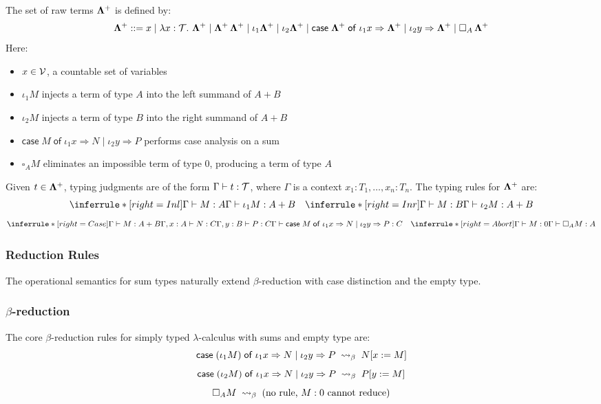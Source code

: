 \begin{definition}
The set of raw terms \( \mathbf{\Lambda}^+ \) is defined by:
\[
  \mathbf{\Lambda}^+ ::= x 
    \mid \lambda x : \mathcal{T}.\ \mathbf{\Lambda}^+ 
    \mid \mathbf{\Lambda}^+\,\mathbf{\Lambda}^+ 
    \mid \iota_1 \mathbf{\Lambda}^+ 
    \mid \iota_2 \mathbf{\Lambda}^+ 
    \mid \mathsf{case}\; \mathbf{\Lambda}^+\; \mathsf{of}\;\iota_1 x \Rightarrow \mathbf{\Lambda}^+ \mid \iota_2 y \Rightarrow \mathbf{\Lambda}^+
    \mid \square_A\,\mathbf{\Lambda}^+
\]
Here:
\begin{itemize}
  \item \( x \in \mathcal{V} \), a countable set of variables
  \item \( \iota_1 M \) injects a term of type $A$ into the left summand of $A+B$
  \item \( \iota_2 M \) injects a term of type $B$ into the right summand of $A+B$
  \item \( \mathsf{case}\;M\;\mathsf{of}\;\iota_1 x \Rightarrow N \mid \iota_2 y \Rightarrow P \) performs case analysis on a sum
  \item \( \square_A M \) eliminates an impossible term of type $0$, producing a term of type $A$
\end{itemize}
\end{definition}
\begin{definition}
Given $t \in \mathbf{\Lambda}^+$, typing judgments are of the form \( \Gamma \vdash t : \mathcal{T} \), where \( \Gamma \) is a context \( x_1 : T_1, \dots, x_n : T_n \). The typing rules for \( \mathbf{\Lambda}^+ \) are:
\[
  \inferrule*[right=Inl]
  { \Gamma \vdash M : A }
  { \Gamma \vdash \iota_1 M : A + B }
  \quad
  \inferrule*[right=Inr]
  { \Gamma \vdash M : B }
  { \Gamma \vdash \iota_2 M : A + B }
\]
\[
  \inferrule*[right=Case]
  { \Gamma \vdash M : A + B \\ \Gamma, x:A \vdash N : C \\ \Gamma, y:B \vdash P : C }
  { \Gamma \vdash \mathsf{case}\;M\;\mathsf{of}\;\iota_1 x \Rightarrow N \mid \iota_2 y \Rightarrow P : C }
  \quad
  \inferrule*[right=Abort]
  { \Gamma \vdash M : 0 }
  { \Gamma \vdash \square_A M : A }
\]

\end{definition}
\subsubsection{\centering Reduction Rules}
The operational semantics for sum types naturally extend $\beta$-reduction with case distinction and the empty type.
\subsubsection{\centering $\beta$-reduction}
The core $\beta$-reduction rules for simply typed $\lambda$-calculus with sums and empty type are:
\[
  \mathsf{case}\;(\iota_1 M)\;\mathsf{of}\;\iota_1 x \Rightarrow N \mid \iota_2 y \Rightarrow P \;\mathrel{\leadsto}_\beta\; N[x := M]
\]
\[
  \mathsf{case}\;(\iota_2 M)\;\mathsf{of}\;\iota_1 x \Rightarrow N \mid \iota_2 y \Rightarrow P \;\mathrel{\leadsto}_\beta\; P[y := M]
\]
\[
  \square_A M \;\mathrel{\leadsto}_\beta\; \text{(no rule, $M:0$ cannot reduce)}
\]
